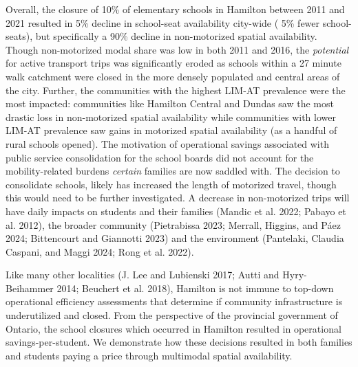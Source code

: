 \documentclass[
default
]{sn-jnl}
\begin{document}
Overall, the closure of 10\% of elementary schools in Hamilton between
2011 and 2021 resulted in 5\% decline in school-seat availability
city-wide ( 5\% fewer school-seats), but specifically a 90\% decline in
non-motorized spatial availability. Though non-motorized modal share was
low in both 2011 and 2016, the \emph{potential} for active transport
trips was significantly eroded as schools within a 27 minute walk
catchment were closed in the more densely populated and central areas of
the city. Further, the communities with the highest LIM-AT prevalence
were the most impacted: communities like Hamilton Central and Dundas saw
the most drastic loss in non-motorized spatial availability while
communities with lower LIM-AT prevalence saw gains in motorized spatial
availability (as a handful of rural schools opened). The motivation of
operational savings associated with public service consolidation for the
school boards did not account for the mobility-related burdens
\emph{certain} families are now saddled with. The decision to
consolidate schools, likely has increased the length of motorized
travel, though this would need to be further investigated. A decrease in
non-motorized trips will have daily impacts on students and their
families (Mandic et al. 2022; Pabayo et al. 2012), the broader community
(Pietrabissa 2023; Merrall, Higgins, and Páez 2024; Bittencourt and
Giannotti 2023) and the environment (Pantelaki, Claudia Caspani, and
Maggi 2024; Rong et al. 2022).

Like many other localities (J. Lee and Lubienski 2017; Autti and
Hyry-Beihammer 2014; Beuchert et al. 2018), Hamilton is not immune to
top-down operational efficiency assessments that determine if community
infrastructure is underutilized and closed. From the perspective of the
provincial government of Ontario, the school closures which occurred in
Hamilton resulted in operational savings-per-student. We demonstrate how
these decisions resulted in both families and students paying a price
through multimodal spatial availability.
\end{document}
